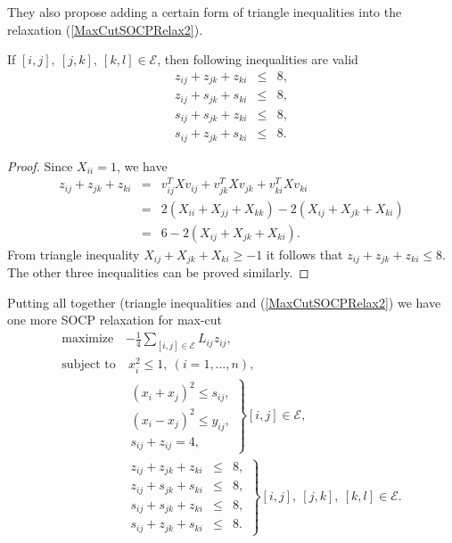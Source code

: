 \documentclass[12pt]{book}
\theoremstyle{definition}
\begin{document}
They also propose adding a certain form of triangle inequalities into the relaxation (\ref{MaxCutSOCPRelax2}). 

\prop \label{MuramatsuTriangleIneq}
If $[i,j],\ [j,k],\ [k,l]\in\mathcal{E}$, then following inequalities are valid \rm
\begin{eqnarray*}
z_{ij} + z_{jk} + z_{ki} &\leq & 8, \\
z_{ij} + s_{jk} + s_{ki} &\leq & 8, \\
s_{ij} + s_{jk} + z_{ki} &\leq & 8, \\
s_{ij} + z_{jk} + s_{ki} &\leq & 8.
\end{eqnarray*}

\begin{proof}
Since $X_{ii} = 1 $, we have 
\begin{eqnarray*}
z_{ij} + z_{jk} + z_{ki} &=& v_{ij}^TXv_{ij} + v_{jk}^TXv_{jk} + v_{ki}^TXv_{ki} \\
 & = & 2(X_{ii} + X_{jj} + X_{kk}) - 2(X_{ij} + X_{jk} + X_{ki}) \\
 & = & 6 - 2(X_{ij} + X_{jk} + X_{ki}).
\end{eqnarray*}
From triangle inequality $X_{ij} + X_{jk} + X_{ki}\geq -1$ it follows that $z_{ij} + z_{jk} + z_{ki} \leq 8.$ The other three inequalities can be proved similarly.
\end{proof}

Putting all together (triangle inequalities and (\ref{MaxCutSOCPRelax2}) we have one more SOCP relaxation for max-cut
\begin{equation}
\begin{array}{ll}
\label{MaxCutSOCPRelax2+TriangleIneq}
\mbox{maximize} & - \frac{1}{4}\sum_{[i,j]\in \mathcal{E}} L_{ij}z_{ij}, \\
\mbox{subject to} & \ x_i^2\leq 1 , \ (i = 1,\dots ,n),\\
&  \left.\begin{array}{lcl}
	(x_i + x_j)^2 \leq s_{ij},  \\
 	(x_i - x_j)^2 \leq y_{ij},  \\
 	s_{ij} + z_{ij} = 4,  
 \end{array}\right\rbrace [i,j] \in\mathcal{E},\\
& \left.\begin{array}{lcl}
	z_{ij} + z_{jk} + z_{ki} &\leq & 8, \\
	z_{ij} + s_{jk} + s_{ki} &\leq & 8, \\
	s_{ij} + s_{jk} + z_{ki} &\leq & 8, \\
	s_{ij} + z_{jk} + s_{ki} &\leq & 8.
\end{array}\right\rbrace [i,j],\ [j,k],\ [k,l]\in\mathcal{E}.
\end{array}
\end{equation}
\end{document}
